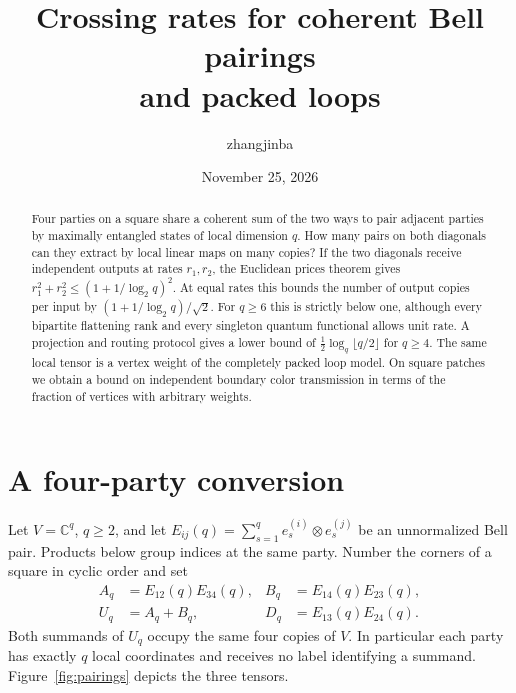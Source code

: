\documentclass[11pt]{article}
\title{Crossing rates for coherent Bell pairings\\and packed loops}
\author{zhangjinba}
\date{November 25, 2026}
\newcommand{\C}{\mathbb C}
\begin{document}
\maketitle
\begin{abstract}
Four parties on a square share a coherent sum of the two ways to pair adjacent
parties by maximally entangled states of local dimension \(q\). How many pairs
on both diagonals can they extract by local linear maps on many copies?
If the two diagonals receive independent outputs at rates \(r_1,r_2\),
the Euclidean prices theorem gives
\(r_1^2+r_2^2\le(1+1/\log_2 q)^2\). At equal rates this bounds the
number of output copies per input by \((1+1/\log_2 q)/\sqrt{2}\).
For \(q\ge6\) this is strictly below one, although every bipartite
flattening rank and every singleton quantum functional allows unit rate. A projection and routing protocol gives
a lower bound of \(\tfrac12\log_q\lfloor q/2\rfloor\) for \(q\ge4\).
The same local tensor is a vertex weight of the completely packed loop model.
On square patches we obtain a bound on independent boundary color
transmission in terms of the fraction of vertices with arbitrary weights.
\end{abstract}

\section{A four-party conversion}

Let \(V=\C^q\), \(q\ge2\), and let \(E_{ij}(q)=\sum_{s=1}^q e_s^{(i)}
\otimes e_s^{(j)}\) be an unnormalized Bell pair. Products below group indices
at the same party. Number the corners of a square in cyclic order and set
\begin{align*}
 A_q&=E_{12}(q)E_{34}(q), & B_q&=E_{14}(q)E_{23}(q),\\
 U_q&=A_q+B_q,             & D_q&=E_{13}(q)E_{24}(q).
\end{align*}
Both summands of \(U_q\) occupy the same four copies of \(V\). In particular
each party has exactly \(q\) local coordinates and receives no label
identifying a summand. Figure~\ref{fig:pairings} depicts the three tensors.
\end{document}
